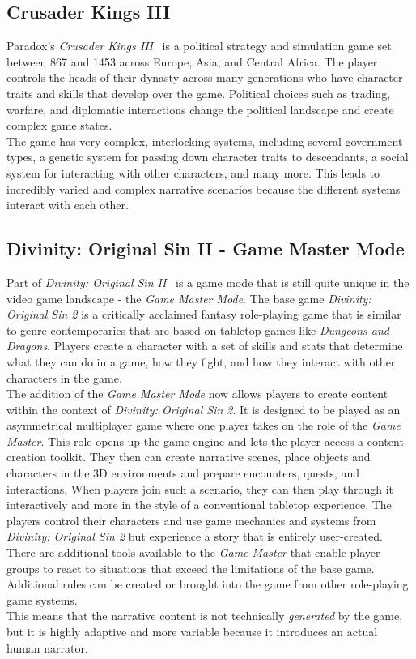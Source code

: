 \subsection{Crusader Kings III}
Paradox's \textit{Crusader Kings III}~\cite{crusader} is a political strategy and simulation game set between 867 and 1453 across Europe, Asia, and Central Africa. The player controls the heads of their dynasty across many generations who have character traits and skills that develop over the game. Political choices such as trading, warfare, and diplomatic interactions change the political landscape and create complex game states.\\
The game has very complex, interlocking systems, including several government types, a genetic system for passing down character traits to descendants, a social system for interacting with other characters, and many more. This leads to incredibly varied and complex narrative scenarios because the different systems interact with each other.
\subsection{Divinity: Original Sin II - Game Master Mode}
Part of \textit{Divinity: Original Sin II}~\cite{divinity} is a game mode that is still quite unique in the video game landscape - the \textit{Game Master Mode}. The base game \textit{Divinity: Original Sin 2} is a critically acclaimed fantasy role-playing game that is similar to genre contemporaries that are based on tabletop games like \textit{Dungeons and Dragons}. Players create a character with a set of skills and stats that determine what they can do in a game, how they fight, and how they interact with other characters in the game.\\
The addition of the \textit{Game Master Mode} now allows players to create content within the context of \textit{Divinity: Original Sin 2}. It is designed to be played as an asymmetrical multiplayer game where one player takes on the role of the \textit{Game Master}. This role opens up the game engine and lets the player access a content creation toolkit. They then can create narrative scenes, place objects and characters in the 3D environments and prepare encounters, quests, and interactions. When players join such a scenario, they can then play through it interactively and more in the style of a conventional tabletop experience. The players control their characters and use game mechanics and systems from \textit{Divinity: Original Sin 2} but experience a story that is entirely user-created. There are additional tools available to the \textit{Game Master} that enable player groups to react to situations that exceed the limitations of the base game. Additional rules can be created or brought into the game from other role-playing game systems.\\
This means that the narrative content is not technically \textit{generated} by the game, but it is highly adaptive and more variable because it introduces an actual human narrator.
